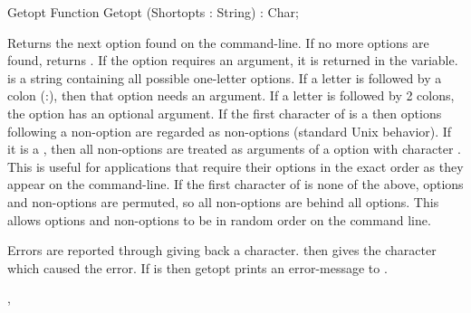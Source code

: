 \begin{function}{Getopt}
\Declaration
Function Getopt (Shortopts : String) : Char;

\Description

Returns the next option found on the command-line. If no more options are
found, returns . If the option requires an argument, it is
returned in the  variable.
 is a string containing all possible one-letter options.
If a letter is followed by a colon (:), then that option needs an argument.
If a letter is followed by 2 colons, the option has an optional argument.
If the first character of  is a  then options following a non-option are
regarded as non-options (standard Unix behavior). If it is a ,
then all non-options are treated as arguments of a option with character
. This is useful for applications that require their options in
the exact order as they appear on the command-line.
If the first character of  is none of the above, options
and non-options are permuted, so all non-options are behind all options.
This allows options and non-options to be in random order on the command
line.

\Errors
 
Errors are reported through giving back a  character. 
then gives the character which caused the error. If  is
 then getopt prints an error-message to .

\SeeAlso
{}, 
\end{function}
\html{}

